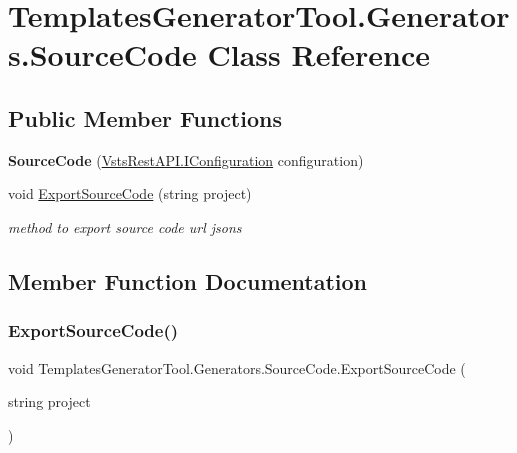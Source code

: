 \hypertarget{class_templates_generator_tool_1_1_generators_1_1_source_code}{}\section{Templates\+Generator\+Tool.\+Generators.\+Source\+Code Class Reference}
\label{class_templates_generator_tool_1_1_generators_1_1_source_code}
\subsection*{Public Member Functions}
\begin{DoxyCompactItemize}
\item 
\mbox{\label{class_templates_generator_tool_1_1_generators_1_1_source_code_a5c1c7360088748de7af6bd2777a25a79}} 
{\bfseries Source\+Code} (\mbox{\hyperlink{interface_vsts_rest_a_p_i_1_1_i_configuration}{Vsts\+Rest\+A\+P\+I.\+I\+Configuration}} configuration)
\item 
void \mbox{\hyperlink{class_templates_generator_tool_1_1_generators_1_1_source_code_a9ec5af1319436537f1aa58ed45c3ca7f}{Export\+Source\+Code}} (string project)
\begin{DoxyCompactList}\small\item\em method to export source code url jsons \end{DoxyCompactList}\end{DoxyCompactItemize}


\subsection{Member Function Documentation}
\mbox{\label{class_templates_generator_tool_1_1_generators_1_1_source_code_a9ec5af1319436537f1aa58ed45c3ca7f}} 
\subsubsection{\texorpdfstring{Export\+Source\+Code()}{ExportSourceCode()}}
{\footnotesize\ttfamily void Templates\+Generator\+Tool.\+Generators.\+Source\+Code.\+Export\+Source\+Code (\begin{DoxyParamCaption}\item[{string}]{project }\end{DoxyParamCaption})}



